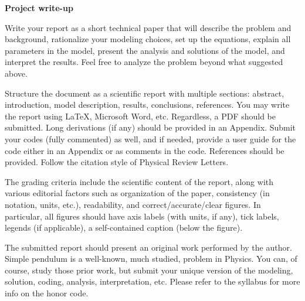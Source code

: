 \documentclass[letterpaper]{article}
\begin{document}
{\begin{center}\Large{\textbf{Project write-up}}\end{center}}

Write your report as a short technical paper that will describe the problem and background, rationalize your modeling choices, set up the equations, explain all parameters in the model, present the analysis and solutions of the model, and interpret the results. Feel free to analyze the problem beyond what suggested above.

Structure the document as a scientific report with multiple sections: abstract, introduction, model description, results, conclusions, references. You may write the report using \LaTeX, Microsoft Word, etc. Regardless, a PDF should be submitted. Long derivations (if any) should be provided in an Appendix. Submit your codes (fully commented) as well, and if needed, provide a user guide for the code either in an Appendix or as comments in the code. References should be provided. Follow the citation style of Physical Review Letters.

The grading criteria include the scientific content of the report, along with various editorial factors such as organization of the paper, consistency (in notation, units, etc.), readability, and correct/accurate/clear figures. In particular, all figures should have axis labels (with units, if any), tick labels, legends (if applicable), a self-contained caption (below the figure).

The submitted report should present an original work performed by the author. Simple pendulum is a well-known, much studied, problem in Physics. You can, of course, study those prior work, but submit your unique version of the modeling, solution, coding, analysis, interpretation, etc. Please refer to the syllabus for more info on the honor code.
\end{document}
